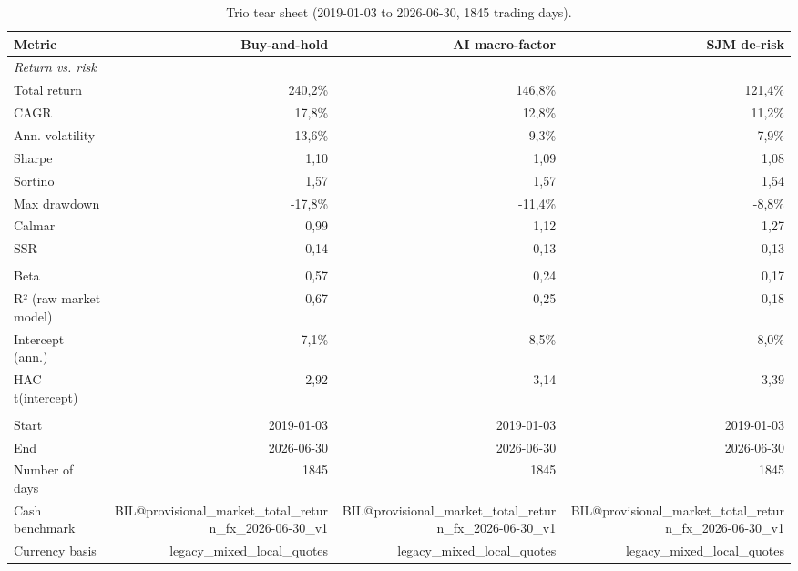 \begin{table}[htbp]
  \centering
  \caption{Trio tear sheet (2019-01-03 to 2026-06-30, 1845 trading days).}
  \label{tab:tearsheet-thesis-de}
  \begin{tabular}{lrrr}
    \toprule
    Metric & Buy-and-hold & AI macro-factor & SJM de-risk \\
    \midrule
    \multicolumn{4}{l}{\textit{Return vs. risk}} \\
    Total return & 240,2\% & 146,8\% & 121,4\% \\
    CAGR & 17,8\% & 12,8\% & 11,2\% \\
    Ann. volatility & 13,6\% & 9,3\% & 7,9\% \\
    Sharpe & 1,10 & 1,09 & 1,08 \\
    Sortino & 1,57 & 1,57 & 1,54 \\
    Max drawdown & -17,8\% & -11,4\% & -8,8\% \\
    Calmar & 0,99 & 1,12 & 1,27 \\
    SSR & 0,14 & 0,13 & 0,13 \\
    \addlinespace
    \multicolumn{4}{l}{\textit{Raw market model}} \\
    Beta & 0,57 & 0,24 & 0,17 \\
    R² (raw market model) & 0,67 & 0,25 & 0,18 \\
    Intercept (ann.) & 7,1\% & 8,5\% & 8,0\% \\
    HAC t(intercept) & 2,92 & 3,14 & 3,39 \\
    \addlinespace
    \multicolumn{4}{l}{\textit{Window and provenance}} \\
    Start & 2019-01-03 & 2019-01-03 & 2019-01-03 \\
    End & 2026-06-30 & 2026-06-30 & 2026-06-30 \\
    Number of days & 1845 & 1845 & 1845 \\
    Cash benchmark & BIL@provisional\_market\_total\_return\_fx\_2026-06-30\_v1 & BIL@provisional\_market\_total\_return\_fx\_2026-06-30\_v1 & BIL@provisional\_market\_total\_return\_fx\_2026-06-30\_v1 \\
    Currency basis & legacy\_mixed\_local\_quotes & legacy\_mixed\_local\_quotes & legacy\_mixed\_local\_quotes \\
    \bottomrule
  \end{tabular}
\end{table}
